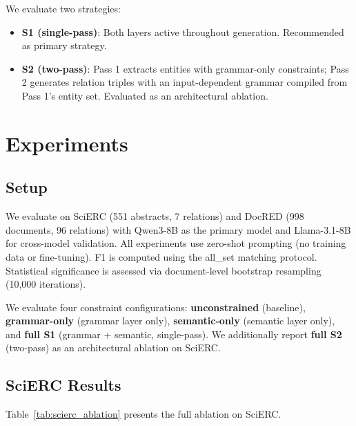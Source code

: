 \documentclass[11pt,a4paper]{article}
\begin{document}
We evaluate two strategies:
\begin{itemize}[nosep]
    \item \textbf{S1 (single-pass)}: Both layers active throughout generation. Recommended as primary strategy.
    \item \textbf{S2 (two-pass)}: Pass 1 extracts entities with grammar-only constraints; Pass 2 generates relation triples with an input-dependent grammar compiled from Pass 1's entity set. Evaluated as an architectural ablation.
\end{itemize}

\section{Experiments}
\label{sec:experiments}

\subsection{Setup}

We evaluate on SciERC (551 abstracts, 7 relations) and DocRED (998 documents, 96 relations) with Qwen3-8B as the primary model and Llama-3.1-8B for cross-model validation.
All experiments use zero-shot prompting (no training data or fine-tuning).
F1 is computed using the all\_set matching protocol.
Statistical significance is assessed via document-level bootstrap resampling (10{,}000 iterations).

We evaluate four constraint configurations: \textbf{unconstrained} (baseline), \textbf{grammar-only} (grammar layer only), \textbf{semantic-only} (semantic layer only), and \textbf{full S1} (grammar + semantic, single-pass).
We additionally report \textbf{full S2} (two-pass) as an architectural ablation on SciERC.

\subsection{SciERC Results}
\label{sec:scierc_results}

Table~\ref{tab:scierc_ablation} presents the full ablation on SciERC.
\end{document}
